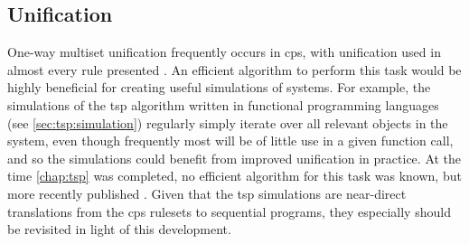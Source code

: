 






\subsection{Unification}

One-way multiset unification frequently occurs in \gls{cps}, with unification used in almost every rule presented .  An efficient algorithm to perform this task would be highly beneficial for creating useful simulations of systems.  For example, the simulations of the \gls{tsp} algorithm written in functional programming languages (see \vref{sec:tsp:simulation}) regularly simply iterate over all relevant objects in the system, even though frequently most will be of little use in a given function call, and so the simulations could benefit from improved unification in practice.  At the time \cref{chap:tsp} was completed, no efficient algorithm for this task was known, but more recently \citeauthor{Liu2021} published  \cite{Liu2021}.  Given that the \gls{tsp} simulations are near-direct translations from the \gls{cps} \glspl{ruleset} to sequential programs, they especially should be revisited in light of this development.  %

